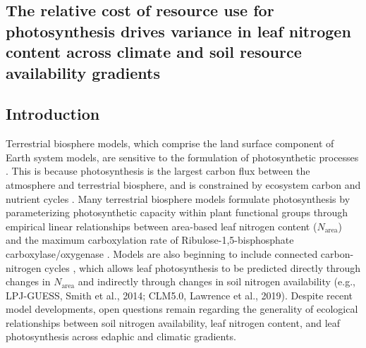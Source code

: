 \begin{singlespace}
    \chapter{\textbf{The relative cost of resource use for photosynthesis drives variance in leaf nitrogen content across climate and soil resource availability gradients}}
    \end{singlespace}
    
    \section{Introduction}
    
    Terrestrial biosphere models, which comprise the land surface component of Earth system models, are sensitive to the formulation of photosynthetic processes . This is because photosynthesis is the largest carbon flux between the atmosphere and terrestrial biosphere, and is constrained by ecosystem carbon and nutrient cycles . Many terrestrial biosphere models formulate photosynthesis by parameterizing photosynthetic capacity within plant functional groups through empirical linear relationships between area-based leaf nitrogen content ($N_\mathrm{area}$) and the maximum carboxylation rate of Ribulose-1,5-bisphosphate carboxylase/oxygenase . Models are also beginning to include connected carbon-nitrogen cycles , which allows leaf photosynthesis to be predicted directly through changes in $N_{\mathrm{area}}$ and indirectly through changes in soil nitrogen availability (e.g., LPJ-GUESS, Smith et al., 2014; CLM5.0, Lawrence et al., 2019). Despite recent model developments, open questions remain regarding the generality of ecological relationships between soil nitrogen availability, leaf nitrogen content, and leaf photosynthesis across edaphic and climatic gradients.

